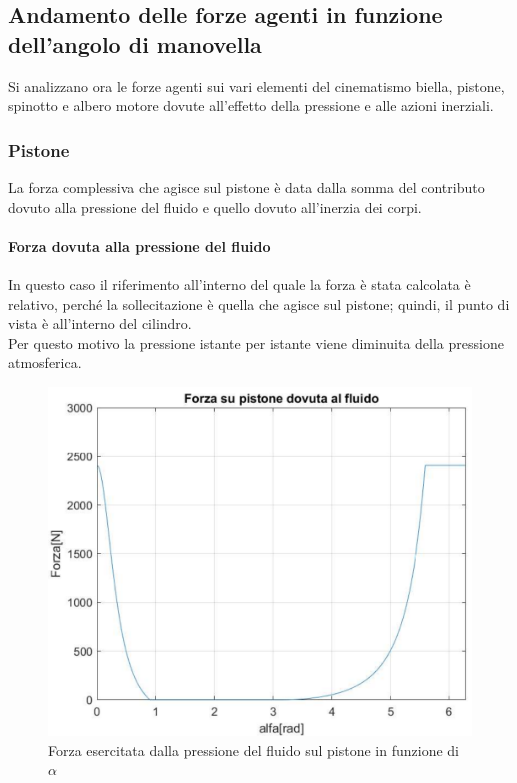 \subsection{Andamento delle forze agenti in funzione dell'angolo di manovella}
Si analizzano ora le forze agenti sui vari elementi del cinematismo biella, pistone, spinotto e albero motore dovute all’effetto della pressione e alle azioni inerziali. 
\subsubsection{Pistone}
La forza complessiva che agisce sul pistone è data dalla somma del contributo dovuto alla pressione del fluido e quello dovuto all’inerzia dei corpi.
\paragraph{Forza dovuta alla pressione del fluido}
In questo caso il riferimento all’interno del quale la forza è stata calcolata è relativo, perché la sollecitazione è quella che agisce sul pistone; quindi, il punto di vista è all’interno del cilindro.\\
Per questo motivo la pressione istante per istante viene diminuita della pressione atmosferica. 
\begin{figure}[h]
    \centering
    \includegraphics[scale=0.6]{Immagini/ForzaFluidoPistone.png}
    \caption{Forza esercitata dalla pressione del fluido sul pistone in funzione di $\alpha$}
    \label{fig:ForzaFluidoPistone}
\end{figure}
